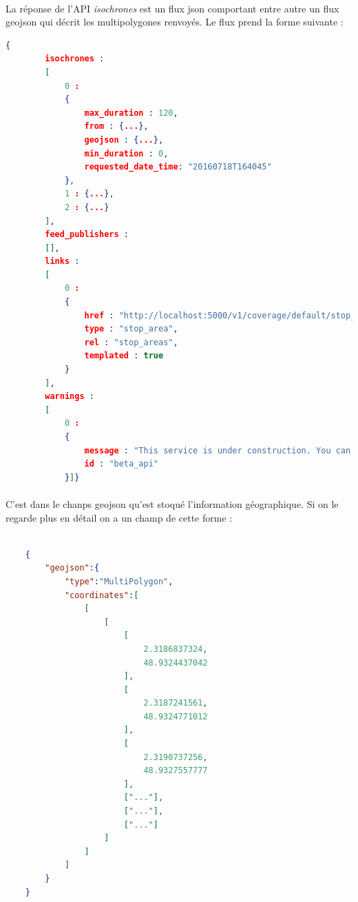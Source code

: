 \documentclass[a4paper]{report}
\begin{document}
\paragraph{} La réponse de l'API \emph{isochrones} est un flux json comportant entre autre un flux geojson qui décrit les multipolygones renvoyés. Le flux prend la forme suivante :


\begin{lstlisting}[language=json,firstnumber=1]
    {
        isochrones :
        [
            0 :
            {
                max_duration : 120,
                from : {...},
                geojson : {...},
                min_duration : 0,
                requested_date_time: "20160718T164045"
            },
            1 : {...},
            2 : {...}
        ],
        feed_publishers :
        [],
        links :
        [
            0 :
            {
                href : "http://localhost:5000/v1/coverage/default/stop_areas/{stop_area.id}",
                type : "stop_area",
                rel : "stop_areas",
                templated : true
            }
        ],
        warnings :
        [
            0 :
            {
                message : "This service is under construction. You can help through github.com/CanalTP/navitia",
                id : "beta_api"
            }]}

\end{lstlisting}

\paragraph{} C'est dans le chanps geojson qu'est stoqué l'information géographique. Si on le regarde plus en détail on a un champ de cette forme :


\begin{lstlisting}[language=json,firstnumber=1]

    {
        "geojson":{
            "type":"MultiPolygon",
            "coordinates":[
                [
                    [
                        [
                            2.3186837324,
                            48.9324437042
                        ],
                        [
                            2.3187241561,
                            48.9324771012
                        ],
                        [
                            2.3190737256,
                            48.9327557777
                        ],
                        ["..."],
                        ["..."],
                        ["..."]
                    ]
                ]
            ]
        }
    }
\end{lstlisting}
\end{document}
